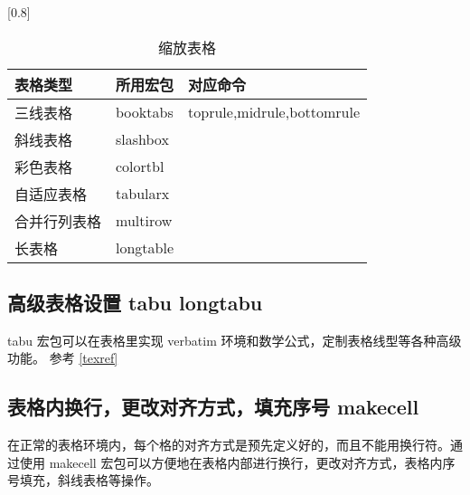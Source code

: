 \begin{table}[htbp]
  \centering
  \caption{缩放表格}\label{table_scale}
  \scalebox{1.25}[0.8]{
  \begin{tabular}{lll}
    \toprule
    表格类型 & 所用宏包 & 对应命令\\
    \midrule
    三线表格 & booktabs  & toprule,midrule,bottomrule \\
    斜线表格 & slashbox \\
    彩色表格 & colortbl \\
    自适应表格 & tabularx\\
    合并行列表格 & multirow \\
    长表格& longtable \\
    \bottomrule
  \end{tabular}
  }
\end{table}

\subsection{高级表格设置 tabu longtabu}
tabu 宏包可以在表格里实现 verbatim 环境和数学公式，定制表格线型等各种高级功能。
参考 \ref{texref}
\subsection{表格内换行，更改对齐方式，填充序号 makecell}

 在正常的表格环境内，每个格的对齐方式是预先定义好的，而且不能用换行符。通过使用 makecell 宏包可以方便地在表格内部进行换行，更改对齐方式，表格内序号填充，斜线表格等操作。

